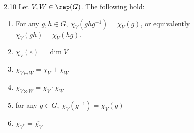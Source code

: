 \documentclass[twoside = false,	%
		headsepline,		%
		parskip = true,
		]{scrbook}						%
\begin{document}
        \begin{lemma}{}{2.10}
            Let $V,W\in\rep(G)$. The following hold:
            \begin{enumerate}
                \item For any $g,h\in G,\ \chi_V(ghg^{-1})=\chi_V(g)$, or equivalently $\chi_V(gh)=\chi_V(hg)$.
                \item $\chi_V(e)=\dim V$
                \item $\chi_{V\oplus W}=\chi_V+\chi_W$
                \item $\chi_{V\otimes W} = \chi_V \cdot \chi_W$
                \item for any $g\in G,\ \chi_V(g^{-1}) = \overline{\chi_V(g)}$
                \item $\chi_{V^*}=\overline{\chi_V}$
            \end{enumerate}
        \end{lemma}
\end{document}
